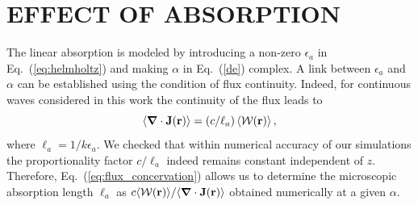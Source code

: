 \section{EFFECT OF ABSORPTION}
\label{sec:absorption}

The linear absorption is modeled by introducing a non-zero $\epsilon_a$ in Eq.~(\ref{eq:helmholtz}) and making $\alpha$ in Eq.~(\ref{de}) complex. A link between $\epsilon_a$ and $\alpha$ can be established using the condition of flux continuity. Indeed, for continuous waves considered in this work the continuity of the flux leads to
\begin{equation}
\left\langle \mbox{\boldmath$\nabla$} \cdot {\bf J}({\bf r})\right\rangle = (c/\ell_a) \left\langle{\cal W}({\bf r})\right\rangle,
\label{eq:flux_concervation}
\end{equation}
where $\ell_a = 1/k\epsilon_a$.
We checked that within numerical accuracy of our simulations the proportionality factor $c/\ell_a$ indeed remains constant independent of $z$. Therefore, Eq.~(\ref{eq:flux_concervation}) allows us to determine the microscopic absorption length $\ell_a$ as
$c \langle{\cal W}({\bf r})\rangle/\langle \mbox{\boldmath$\nabla$} \cdot {\bf J}({\bf r})\rangle$ obtained numerically at a given $\alpha$.

